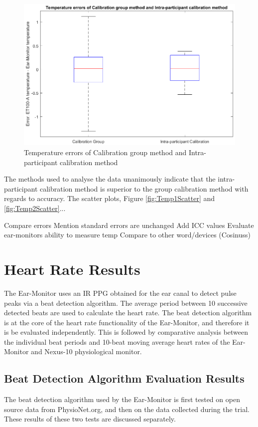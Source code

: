 \begin{figure}[H]
   \centering
   \includegraphics[width=12cm,height=7.5cm]{figs/ComparingCalibrationBoxplot.png}
   \caption{Temperature errors of Calibration group method and Intra-participant calibration method}
   \label{fig:ComparingCalibrationBoxplot}
\end{figure}

The methods used to analyse the data unanimously indicate that the intra-participant calibration method is superior to the group calibration method with regards to accuracy. The scatter plots, Figure \ref{fig:Temp1Scatter} and \ref{fig:Temp2Scatter}...

Compare errors
Mention standard errors are unchanged
Add ICC values
Evaluate ear-monitors ability to measure temp
Compare to other word/devices (Cosinuss)



\section{Heart Rate Results}
The Ear-Monitor uses an IR PPG obtained for the ear canal to detect pulse peaks via a beat detection algorithm. The average period between 10 successive detected beats are used to calculate the heart rate. The beat detection algorithm is at the core of the heart rate functionality of the Ear-Monitor, and therefore it is be evaluated independently. This is followed by comparative analysis between the individual beat periods and 10-beat moving average heart rates of the Ear-Monitor and Nexus-10 physiological monitor.

\subsection{Beat Detection Algorithm Evaluation Results}
The beat detection algorithm used by the Ear-Monitor is first tested on open source data from PhysioNet.org, and then on the data collected during the trial. These results of these two tests are discussed separately. 

